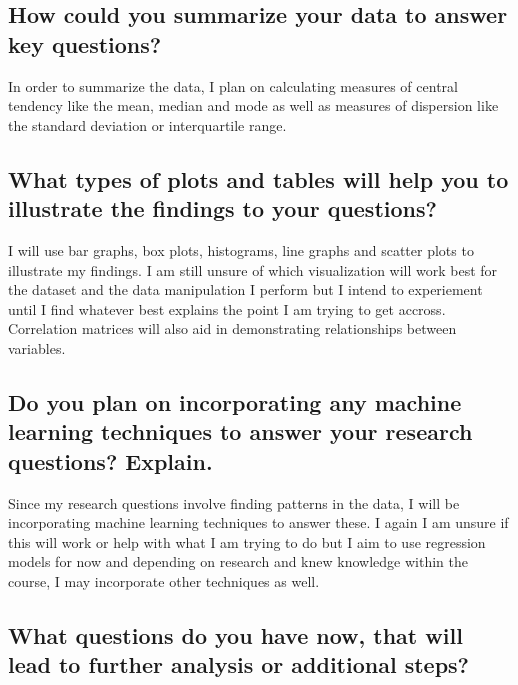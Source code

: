 \documentclass[
]{article}
\begin{document}
\subsection{How could you summarize your data to answer key
questions?}\label{how-could-you-summarize-your-data-to-answer-key-questions}

In order to summarize the data, I plan on calculating measures of
central tendency like the mean, median and mode as well as measures of
dispersion like the standard deviation or interquartile range.

\subsection{What types of plots and tables will help you to illustrate
the findings to your
questions?}\label{what-types-of-plots-and-tables-will-help-you-to-illustrate-the-findings-to-your-questions}

I will use bar graphs, box plots, histograms, line graphs and scatter
plots to illustrate my findings. I am still unsure of which
visualization will work best for the dataset and the data manipulation I
perform but I intend to experiement until I find whatever best explains
the point I am trying to get accross. Correlation matrices will also aid
in demonstrating relationships between variables.

\subsection{Do you plan on incorporating any machine learning techniques
to answer your research questions?
Explain.}\label{do-you-plan-on-incorporating-any-machine-learning-techniques-to-answer-your-research-questions-explain.}

Since my research questions involve finding patterns in the data, I will
be incorporating machine learning techniques to answer these. I again I
am unsure if this will work or help with what I am trying to do but I
aim to use regression models for now and depending on research and knew
knowledge within the course, I may incorporate other techniques as well.

\subsection{What questions do you have now, that will lead to further
analysis or additional
steps?}\label{what-questions-do-you-have-now-that-will-lead-to-further-analysis-or-additional-steps}
\end{document}
